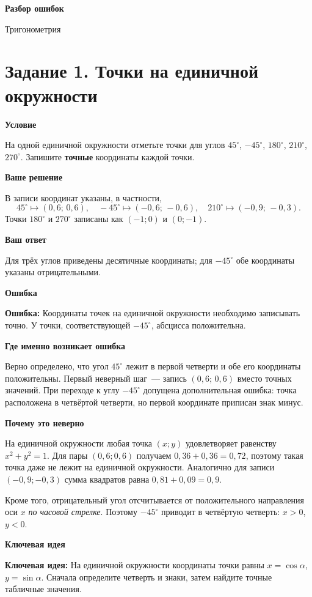 \documentclass[a4paper,12pt]{article}
\newcommand{\rubric}[1]{\par\medskip\textbf{#1}\par\nobreak}
\newcommand{\err}[1]{\textcolor{errorred}{\textbf{Ошибка:}} #1}
\newcommand{\keyidea}[1]{\textcolor{accent}{\textbf{Ключевая идея:}} #1}
\begin{document}
\clearpage
\thispagestyle{fancy}
\vspace*{\fill}
\begin{center}
{\LARGE\bfseries Разбор ошибок}\par
\vspace{7mm}
{\large Тригонометрия}\par
\end{center}
\vspace*{\fill}
\clearpage

\label{task:1}
\section*{Задание 1. Точки на единичной окружности}
\rubric{Условие}
На одной единичной окружности отметьте точки для углов $45^\circ$, $-45^\circ$, $180^\circ$, $210^\circ$, $270^\circ$. Запишите \textbf{точные} координаты каждой точки.

\rubric{Ваше решение}
В записи координат указаны, в частности,
\[
45^\circ\mapsto(0{,}6;\,0{,}6),\quad
-45^\circ\mapsto(-0{,}6;\,-0{,}6),\quad
210^\circ\mapsto(-0{,}9;\,-0{,}3).
\]
Точки $180^\circ$ и $270^\circ$ записаны как $(-1;0)$ и $(0;-1)$.

\rubric{Ваш ответ}
Для трёх углов приведены десятичные координаты; для $-45^\circ$ обе координаты указаны отрицательными.

\rubric{Ошибка}
\err{Координаты точек на единичной окружности необходимо записывать точно. У точки, соответствующей $-45^\circ$, абсцисса положительна.}

\rubric{Где именно возникает ошибка}
Верно определено, что угол $45^\circ$ лежит в первой четверти и обе его координаты положительны. Первый неверный шаг~--- запись $(0{,}6;\,0{,}6)$ вместо точных значений. При переходе к углу $-45^\circ$ допущена дополнительная ошибка: точка расположена в четвёртой четверти, но первой координате приписан знак минус.

\rubric{Почему это неверно}
На единичной окружности любая точка $(x;y)$ удовлетворяет равенству $x^2+y^2=1$. Для пары $(0{,}6;0{,}6)$ получаем $0{,}36+0{,}36=0{,}72$, поэтому такая точка даже не лежит на единичной окружности. Аналогично для записи $(-0{,}9;-0{,}3)$ сумма квадратов равна $0{,}81+0{,}09=0{,}9$.

Кроме того, отрицательный угол отсчитывается от положительного направления оси $x$ \emph{по часовой стрелке}. Поэтому $-45^\circ$ приводит в четвёртую четверть: $x>0$, $y<0$.

\rubric{Ключевая идея}
\keyidea{На единичной окружности координаты точки равны $x=\cos\alpha$, $y=\sin\alpha$. Сначала определите четверть и знаки, затем найдите точные табличные значения.}
\end{document}
